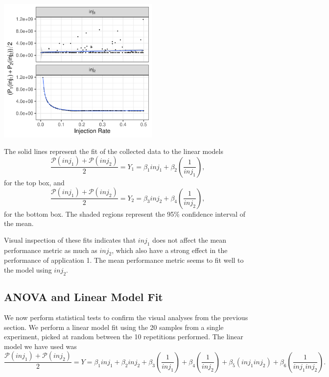 \documentclass[a4paper]{article}
\begin{document}
\begin{center}
\includegraphics[width=0.6\textwidth]{./img/2_apps_min_mean_time/rs_20_samples_10_iterations_scatter.pdf}
\end{center}

The solid lines represent the fit of the collected data to the linear models
\begin{equation*}
\dfrac{\mathcal{P}(inj_1) + \mathcal{P}(inj_2)}{2} =
Y_1 = \beta_{1}inj_1 +
\beta_{2}\left(\dfrac{1}{inj_1}\right)\text{,}
\end{equation*}
for the top box, and
\begin{equation*}
\dfrac{\mathcal{P}(inj_1) + \mathcal{P}(inj_2)}{2} =
Y_2 = \beta_{3}inj_2 +
\beta_{4}\left(\dfrac{1}{inj_2}\right)\text{,}
\end{equation*}
for the bottom box. The shaded  regions represent the 95\% confidence interval of
the mean.

Visual inspection of  these fits indicates that \(inj_1\) does  not affect the mean
performance metric  as much as  \(inj_2\), which also have  a strong effect  in the
performance of application  1. The mean performance metric seems  to fit well to
the model using \(inj_2\).

\subsection{ANOVA and Linear Model Fit}
\label{sec:orgf99dab2}
We  now perform  statistical  tests  to confirm  the  visual  analyses from  the
previous section.   We perform a  linear model fit using  the 20 samples  from a
single experiment, picked  at random between the 10  repetitions performed.  The
linear model we have used was
\begin{equation*}
\dfrac{\mathcal{P}(inj_1) + \mathcal{P}(inj_2)}{2} =
Y = \beta_{1}inj_1 +
\beta_{2}inj_2 +
\beta_{3}\left(\dfrac{1}{inj_1}\right) +
\beta_{4}\left(\dfrac{1}{inj_2}\right) +
\beta_{5}\left(inj_{1}inj_{2}\right) +
\beta_{6}\left(\dfrac{1}{inj_{1}inj_2}\right)\text{.}
\end{equation*}
\end{document}
